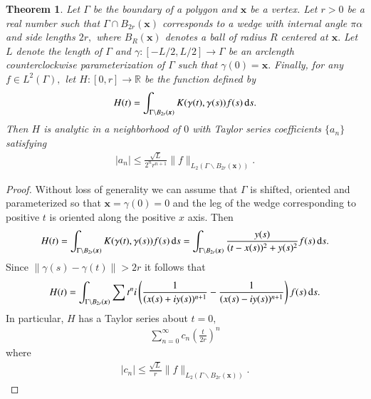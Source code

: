 \documentclass[12pt]{elsarticle}
\newcommand{\bx}{\boldsymbol{x}}
\newtheorem{theorem}{Theorem}
\begin{document}
\begin{theorem}
Let $\Gamma$ be the boundary of a polygon and $\bx$ be a vertex. Let $r>0$ be a real number such that $\Gamma \cap B_{2r}(\bx)$ corresponds to a wedge with internal angle $\pi \alpha$ and side lengths $2r,$ where $B_R(\bx)$ denotes a ball of radius $R$ centered at $\bx.$ Let $L$ denote the length of $\Gamma$ and $\gamma: [-L/2,L/2]\to \Gamma$ be an arclength counterclockwise parameterization of $\Gamma$ such that $\gamma(0) = \bx.$ Finally, for any $f \in L^2(\Gamma),$ let $H:[0,r] \to \mathbb{R}$ be the function defined by
\begin{align}
H(t) = \int_{\Gamma\backslash B_{2r}(\bx)} K(\gamma(t),\gamma(s)) f(s)\,{\rm d}s.
\end{align}
Then $H$ is analytic in a neighborhood of $0$ with Taylor series coefficients $\{ a_n\}$ satisfying
\begin{align}
|a_n| \le \frac{\sqrt{L}}{2^nr^{n+1}} \|f\|_{L_2(\Gamma \backslash B_{2r}(\bx))}.
\end{align}
\end{theorem}
\begin{proof}
Without loss of generality we can assume that $\Gamma$ is shifted, oriented and parameterized so that $\bx = \gamma(0)= 0$ and the leg of the wedge corresponding to positive $t$ is oriented along the positive $x$ axis. Then
\begin{align}
H(t) = \int_{\Gamma\backslash B_{2r}(\bx)} K(\gamma(t),\gamma(s)) f(s)\,{\rm d}s = \int_{\Gamma\backslash B_{2r}(\bx)} \frac{y(s)}{(t-x(s))^2+y(s)^2}f(s)\,{\rm d}s.
\end{align}
Since $\|\gamma(s)-\gamma(t)\| >2r$ it follows that
\begin{align}
H(t) =\int _{\Gamma\backslash B_{2r}(\bx)}\sum {t^n i}\left(\frac{1}{(x(s)+i y(s))^{n+1}}-\frac{1}{(x(s)-i y(s))^{n+1}} \right) f(s)\,{\rm d}s.
\end{align}
In particular, $H$ has a Taylor series about $t=0,$
\begin{align}
\sum_{n=0}^\infty c_n \left(\frac{t}{2r}\right)^n
\end{align}
where
\begin{align}
|c_n| \le  \frac{\sqrt{L}}{r} \|f\|_{L_2(\Gamma \backslash B_{2r}(\bx))}.
\end{align}
\end{proof}
\end{document}
